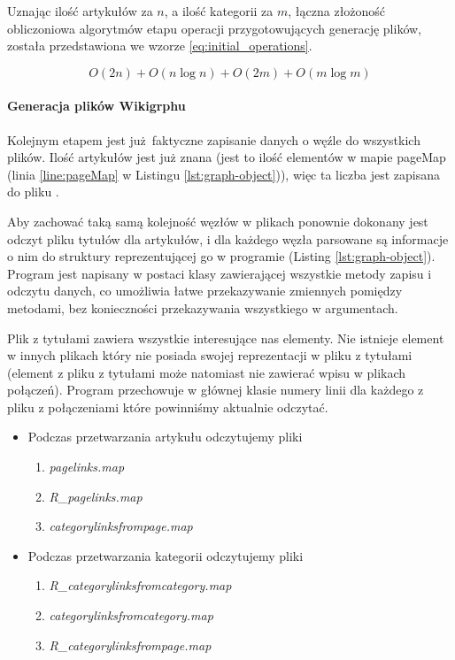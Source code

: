 Uznając ilość artykułów za $n$, a ilość kategorii za $m$, łączna złożoność obliczoniowa algorytmów etapu operacji przygotowujących generację plików, została przedstawiona we wzorze \ref{eq:initial_operations}.

\begin{equation}
O(2n) + O(n\log n) + O(2m) + O(m \log m)
\label{eq:initial_operations}
\end{equation}

\paragraph{Generacja plików Wikigrphu}
Kolejnym etapem jest już faktyczne zapisanie danych o węźle do wszystkich plików. Ilość artykułów jest już znana (jest to ilość elementów w mapie pageMap (linia \ref{line:pageMap} w Listingu \ref{lst:graph-object})), więc ta liczba jest zapisana do pliku .

Aby zachować taką samą kolejność węzłów w plikach ponownie dokonany jest odczyt pliku tytułów dla artykułów, i dla każdego węzła parsowane są informacje o nim do struktury reprezentującej go w programie (Listing \ref{lst:graph-object}). Program jest napisany w postaci klasy zawierającej wszystkie metody zapisu i odczytu danych, co umożliwia łatwe przekazywanie zmiennych pomiędzy metodami, bez konieczności przekazywania wszystkiego w argumentach.

Plik z tytułami zawiera wszystkie interesujące nas elementy. Nie istnieje element w innych plikach który nie posiada swojej reprezentacji w pliku z tytułami (element z pliku z tytułami może natomiast nie zawierać wpisu w plikach połączeń). Program przechowuje w głównej klasie numery linii dla każdego z pliku z połączeniami które powinniśmy aktualnie odczytać.

\begin{itemize}
\item Podczas przetwarzania artykułu odczytujemy pliki
\begin{enumerate}[label=\textbullet]
    \setlength\itemsep{1.1em}
    \item  \textit{pagelinks.map}
    \item  \textit{R\_pagelinks.map}
    \item  \textit{categorylinksfrompage.map}
\end{enumerate}
\item Podczas przetwarzania kategorii odczytujemy pliki
\begin{enumerate}[label=\textbullet]
    \setlength\itemsep{1.1em}
    \item  \textit{R\_categorylinksfromcategory.map}
    \item  \textit{categorylinksfromcategory.map}
    \item  \textit{R\_categorylinksfrompage.map}
\end{enumerate}
\end{itemize}


